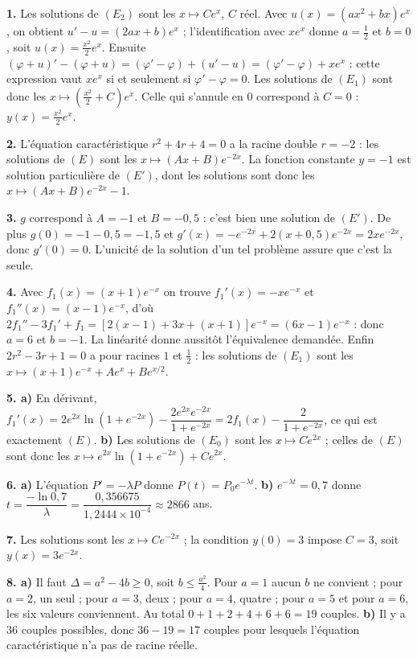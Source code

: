 \begin{corrige}[annales]
\textbf{1.} Les solutions de $(E_{2})$ sont les $x\mapsto Ce^{x}$, $C$ réel.
Avec $u(x) = \left(ax^{2}+bx\right)e^{x}$, on obtient
$u'-u = (2ax+b)e^{x}$ ; l'identification avec $xe^{x}$ donne $a = \frac12$ et
$b = 0$, soit $u(x) = \frac{x^{2}}{2}e^{x}$. Ensuite
$(\varphi+u)'-(\varphi+u) = \left(\varphi'-\varphi\right)+\left(u'-u\right)
= \left(\varphi'-\varphi\right)+xe^{x}$ : cette expression vaut $xe^{x}$ si et
seulement si $\varphi'-\varphi = 0$. Les solutions de $(E_{1})$ sont donc les
$x\mapsto\left(\frac{x^{2}}{2}+C\right)e^{x}$. Celle qui s'annule en $0$
correspond à $C = 0$ : $y(x) = \frac{x^{2}}{2}e^{x}$.

\textbf{2.} L'équation caractéristique $r^{2}+4r+4 = 0$ a la racine double
$r = -2$ : les solutions de $(E)$ sont les $x\mapsto(Ax+B)e^{-2x}$. La
fonction constante $y = -1$ est solution particulière de $(E')$, dont les
solutions sont donc les $x\mapsto(Ax+B)e^{-2x}-1$.

\textbf{3.} $g$ correspond à $A = -1$ et $B = -0{,}5$ : c'est bien une
solution de $(E')$. De plus $g(0) = -1-0{,}5 = -1{,}5$ et
$g'(x) = -e^{-2x}+2(x+0{,}5)e^{-2x} = 2xe^{-2x}$, donc $g'(0) = 0$. L'unicité
de la solution d'un tel problème assure que c'est la seule.

\textbf{4.} Avec $f_{1}(x) = (x+1)e^{-x}$ on trouve $f_{1}'(x) = -xe^{-x}$ et
$f_{1}''(x) = (x-1)e^{-x}$, d'où
$2f_{1}''-3f_{1}'+f_{1} = \left[2(x-1)+3x+(x+1)\right]e^{-x} = (6x-1)e^{-x}$ :
donc $a = 6$ et $b = -1$. La linéarité donne aussitôt l'équivalence
demandée. Enfin $2r^{2}-3r+1 = 0$ a pour racines $1$ et $\frac12$ : les
solutions de $(E_{1})$ sont les
$x\mapsto(x+1)e^{-x}+Ae^{x}+Be^{x/2}$.

\textbf{5. a)} En dérivant,
$f_{1}'(x) = 2e^{2x}\ln\!\left(1+e^{-2x}\right)
-\dfrac{2e^{2x}e^{-2x}}{1+e^{-2x}} = 2f_{1}(x)-\dfrac{2}{1+e^{-2x}}$, ce qui
est exactement $(E)$.
\textbf{b)} Les solutions de $(E_{0})$ sont les $x\mapsto Ce^{2x}$ ; celles de
$(E)$ sont donc les $x\mapsto e^{2x}\ln\!\left(1+e^{-2x}\right)+Ce^{2x}$.

\textbf{6. a)} L'équation $P' = -\lambda P$ donne
$P(t) = P_{0}e^{-\lambda t}$.
\textbf{b)} $e^{-\lambda t} = 0{,}7$ donne
$t = \dfrac{-\ln 0{,}7}{\lambda} = \dfrac{0{,}356675}{1{,}2444\times10^{-4}}
\approx 2866$ ans.

\textbf{7.} Les solutions sont les $x\mapsto Ce^{-2x}$ ; la condition
$y(0) = 3$ impose $C = 3$, soit $y(x) = 3e^{-2x}$.

\textbf{8. a)} Il faut $\Delta = a^{2}-4b \geq 0$, soit $b \leq
\frac{a^{2}}{4}$. Pour $a = 1$ aucun $b$ ne convient ; pour $a = 2$, un seul ;
pour $a = 3$, deux ; pour $a = 4$, quatre ; pour $a = 5$ et pour $a = 6$, les
six valeurs conviennent. Au total $0+1+2+4+6+6 = 19$ couples.
\textbf{b)} Il y a $36$ couples possibles, donc $36-19 = 17$ couples pour
lesquels l'équation caractéristique n'a pas de racine réelle.
\end{corrige}

